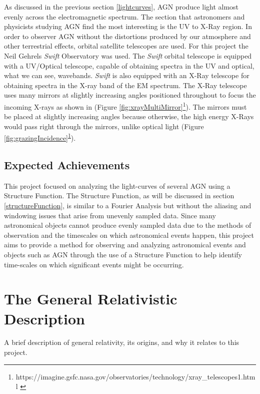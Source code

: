 \documentclass[12pt, oneside]{smuthesis}
\begin{document}
As discussed in the previous section \ref{lightcurves}, AGN produce light almost evenly across the electromagnetic spectrum. The section that astronomers and physicists studying AGN find the most interesting is the UV to X-Ray region. In order to observer AGN without the distortions produced by our atmosphere and other terrestrial effects, orbital satellite telescopes are used. For this project the Neil Gehrels \textit{Swift} Observatory was used. The \textit{Swift} orbital telescope is equipped with a UV/Optical telescope, capable of obtaining spectra in the UV and optical, what we can see, wavebands. \textit{Swift} is also equipped with an X-Ray telescope for obtaining spectra in the X-ray band of the EM spectrum. The X-Ray telescope uses many mirrors at slightly increasing angles positioned throughout to focus the incoming X-rays as shown in (Figure \ref{fig:xrayMultiMirror}\footnote{https://imagine.gsfc.nasa.gov/observatories/technology/xray\_telescopes1.html \label{xrayTelescopeRef}}). The mirrors must be placed at slightly increasing angles because otherwise, the high energy X-Rays would pass right through the mirrors, unlike optical light (Figure \ref{fig:grazingIncidence}\textsuperscript{\ref{xrayTelescopeRef}}).

\section{\sc Expected Achievements} \label{expectedAchievements}

This project focused on analyzing the light-curves of several AGN using a Structure Function. The Structure Function, as will be discussed in section \ref{structureFunction}, is similar to a Fourier Analysis but without the aliasing and windowing issues that arise from unevenly sampled data. Since many astronomical objects cannot produce evenly sampled data due to the methods of observation and the timescales on which astronomical events happen, this project aims to provide a method for observing and analyzing astronomical events and objects such as AGN through the use of a Structure Function to help identify time-scales on which significant events might be occurring.

\chapter{\sc The General Relativistic Description} \label{GRDescription}

A brief description of general relativity, its origins, and why it relates to this project.
\end{document}
